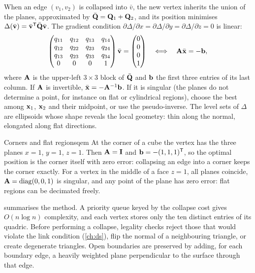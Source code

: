 When an edge $(v_1,v_2)$ is collapsed into $\bar v$, the new vertex inherits the union of the planes,
approximated by $\bar{\mathbf{Q}}=\mathbf{Q}_1+\mathbf{Q}_2$, and its position minimises
$\Delta(\bar{\mathbf{v}})=\bar{\mathbf{v}}^{\mathsf{T}}\bar{\mathbf{Q}}\bar{\mathbf{v}}$. The gradient condition
$\partial\Delta/\partial x=\partial\Delta/\partial y=\partial\Delta/\partial z=0$ is linear:
\begin{equation}
\begin{pmatrix}q_{11}&q_{12}&q_{13}&q_{14}\\q_{12}&q_{22}&q_{23}&q_{24}\\q_{13}&q_{23}&q_{33}&q_{34}\\0&0&0&1\end{pmatrix}\bar{\mathbf{v}}=
\begin{pmatrix}0\\0\\0\\1\end{pmatrix}
\quad\Longleftrightarrow\quad \mathbf{A}\bar{\mathbf{x}}=-\mathbf{b} ,
\end{equation}
where $\mathbf{A}$ is the upper-left $3\times3$ block of $\bar{\mathbf{Q}}$ and $\mathbf{b}$ the first three entries of its
last column. If $\mathbf{A}$ is invertible, $\bar{\mathbf{x}}=-\mathbf{A}^{-1}\mathbf{b}$. If it is singular (the planes do not
determine a point, for instance on flat or cylindrical regions), choose the best among $\mathbf{x}_1$,
$\mathbf{x}_2$ and their midpoint, or use the pseudo-inverse. The level sets of $\Delta$ are ellipsoids
whose shape reveals the local geometry: thin along the normal, elongated along flat directions.

\begin{example}{Corners and flat regions}{qem}
At the corner of a cube the vertex has the three planes $x=1$, $y=1$, $z=1$. Then
$\mathbf{A}=\mathbf{I}$ and $\mathbf{b}=-(1,1,1)^{\mathsf{T}}$, so the optimal position is the corner itself with zero error:
collapsing an edge into a corner keeps the corner exactly. For a vertex in the middle of a face
$z=1$, all planes coincide, $\mathbf{A}=\operatorname{diag}(0,0,1)$ is singular, and any point of the plane has zero
error: flat regions can be decimated freely.
\end{example}

 summarises the method. A priority queue keyed by the collapse cost gives
$O(n\log n)$ complexity, and each vertex stores only the ten distinct entries of its quadric. Before
performing a collapse, legality checks reject those that would violate the link condition
(\cref{ch:ds}), flip the normal of a neighbouring triangle, or create degenerate triangles. Open
boundaries are preserved by adding, for each boundary edge, a heavily weighted plane perpendicular
to the surface through that edge.

